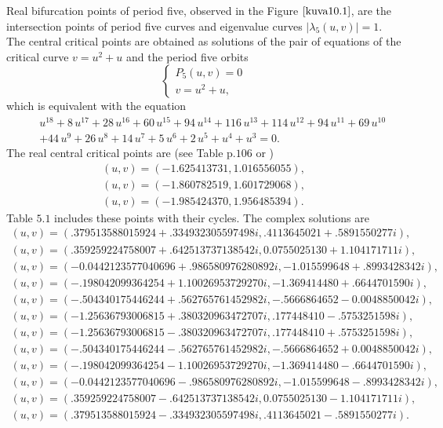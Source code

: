 \documentclass[12pt,a4paper]{amsart}
\numberwithin{equation}{section}
\numberwithin{lause}{section}
\begin{document}
 Real bifurcation points of period five, observed in the Figure $\ref{kuva10.1}$, are the intersection points of period five curves and eigenvalue curves $|\lambda_{5}(u,v)|=1$.  The central critical points are obtained as solutions of the pair of equations of the critical curve $v=u^{2}+u$ and the period five orbits
 \begin{displaymath}
\left\{\begin{array}{l}
     P_{5}(u,v)=0 \\
      v=u^{2}+u,
\end{array}\right.
\end{displaymath}
which is equivalent with the equation
 \begin{eqnarray}
&&{u}^{18}+8\,{u}^{17}+28\,{u}^{16}+60\,{u}^{15}+94\,{u}^{14}+116\,{u}^{13}+114\,{u}^{12}+94\,{u}^{11}+69\,{u}^{10}  \nonumber \\
&&+44\,{u}^{9}+26\,{u}^{8}+14\,{u}^{7}+5\,{u}^{6}+2\,{u}^{5}+{u}^{4}+{u}^{3}=0. \nonumber
\end{eqnarray}
The real central critical points are (see \cite{3} Table p.$106$ or \cite{4})
\begin{displaymath}
\begin{array}{c}
(u,v)=(-1.625413731, 1.016556055), \\ (u,v)=(-1.860782519, 1.601729068), \\  (u,v)=(-1.985424370, 1.956485394).
\end{array}
\end{displaymath}
Table $5.1$ includes these points with their cycles. The complex solutions are
\begin{displaymath}
\begin{array}{l}
 (u,v)=(.379513588015924+.334932305597498i,.4113645021+.5891550277i),\\ (u,v)=(.359259224758007+.642513737138542i, 0.0755025130+1.104171711i),\\ (u,v)=(-0.0442123577040696+.986580976280892i, -1.015599648+.8993428342i),\\ (u,v)=(-.198042099364254+1.10026953729270i, -1.369414480+.6644701590i),\\ (u,v)=(-.504340175446244+.562765761452982i, -.5666864652-0.0048850042i),\\ (u,v)=(-1.25636793006815+.380320963472707i, .177448410-.5753251598i),\\ (u,v)=(-1.25636793006815-.380320963472707i, .177448410+.5753251598i),\\ (u,v)=(-.504340175446244-.562765761452982i, -.5666864652+0.0048850042i),\\ (u,v)=(-.198042099364254-1.10026953729270i, -1.369414480-.6644701590i),\\ (u,v)=(-0.0442123577040696-.986580976280892i, -1.015599648-.8993428342i),\\ (u,v)=(.359259224758007-.642513737138542i, 0.0755025130-1.104171711i),\\ (u,v)=(.379513588015924-.334932305597498i, .4113645021-.5891550277i).
\end{array}
\end{displaymath}
\end{document}
